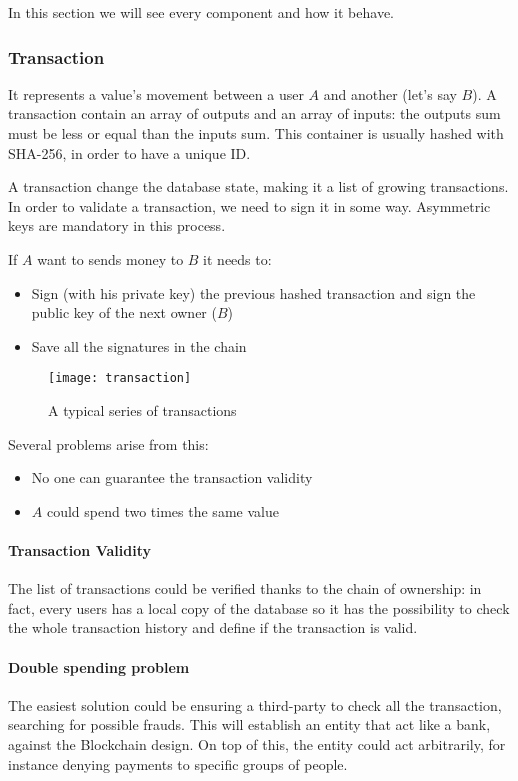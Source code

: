 In this section we will see every component and how it behave.

\subsubsection{Transaction}
It represents a value's movement between a user $A$ and another (let's
say $B$). A transaction contain an array of outputs and an array of
inputs\cite{sok15}: the outputs sum must be less or equal than the inputs sum.
This container is usually hashed with SHA-256, in order to have a
unique ID.

A transaction change the database state, making it a list of growing
transactions.
In order to validate a transaction, we need to sign it in some way. Asymmetric
keys are mandatory in this process.

If $A$ want to sends money to $B$ it needs to:
\begin{itemize}
 \item Sign (with his private key) the previous hashed transaction and sign the
public key of the next owner ($B$)
 \item Save all the signatures in the chain
\end{itemize}

\begin{figure}[h]
 \centering
 \texttt{[image: transaction]}
 \caption{A typical series of transactions}
\end{figure}

Several problems arise from this:
\begin{itemize}
 \item No one can guarantee the transaction validity
 \item $A$ could spend two times the same value
\end{itemize}

\paragraph*{Transaction Validity}
The list of transactions could be verified thanks to the chain of ownership:
in fact, every users has a local copy of the database so it has the possibility
to check the whole transaction history and define if the transaction is valid.

\paragraph*{Double spending problem}
The easiest solution could be ensuring a third-party to check all the
transaction, searching for possible frauds. This will establish an entity
that act like a bank, against the Blockchain design. On top of this,
the entity could act arbitrarily, for instance denying payments to specific
groups of people.

